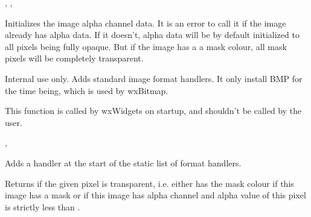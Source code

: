 ,\rtfsp
{},\rtfsp
{}


\label{wximageinitalpha}


Initializes the image alpha channel data. It is an error to call it
if the image already has alpha data. If it doesn't, alpha data will be
by default initialized to all pixels being fully opaque. But if the image has a
a mask colour, all mask pixels will be completely transparent.


\label{wximageinitstandardhandlers}


Internal use only. Adds standard image format handlers. It only install BMP
for the time being, which is used by wxBitmap.

This function is called by wxWidgets on startup, and shouldn't be called by
the user.


,


\label{wximageinserthandler}


Adds a handler at the start of the static list of format handlers.





\label{wximageistransparent}


Returns \true if the given pixel is transparent, i.e. either has the mask
colour if this image has a mask or if this image has alpha channel and alpha
value of this pixel is strictly less than .


\label{wximageloadfile}

